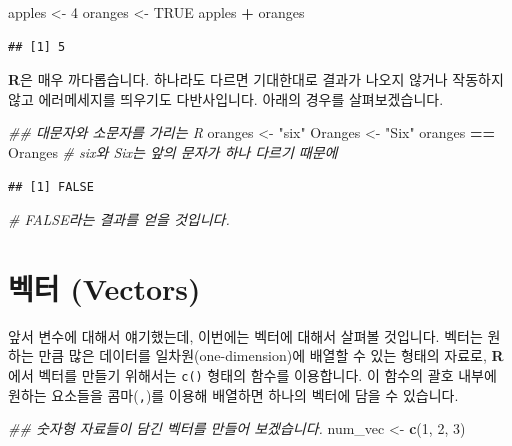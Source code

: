 \documentclass[]{book}
\newenvironment{Shaded}{\begin{snugshade}}{\end{snugshade}}
\newcommand{\CommentTok}[1]{\textcolor[rgb]{0.56,0.35,0.01}{\textit{#1}}}
\newcommand{\DecValTok}[1]{\textcolor[rgb]{0.00,0.00,0.81}{#1}}
\newcommand{\KeywordTok}[1]{\textcolor[rgb]{0.13,0.29,0.53}{\textbf{#1}}}
\newcommand{\NormalTok}[1]{#1}
\newcommand{\OperatorTok}[1]{\textcolor[rgb]{0.81,0.36,0.00}{\textbf{#1}}}
\newcommand{\OtherTok}[1]{\textcolor[rgb]{0.56,0.35,0.01}{#1}}
\newcommand{\StringTok}[1]{\textcolor[rgb]{0.31,0.60,0.02}{#1}}
\begin{document}
\begin{Shaded}
\begin{Highlighting}[]
\NormalTok{apples <-}\StringTok{ }\DecValTok{4} 
\NormalTok{oranges <-}\StringTok{ }\OtherTok{TRUE} 
\NormalTok{apples }\OperatorTok{+}\StringTok{ }\NormalTok{oranges}
\end{Highlighting}
\end{Shaded}

\begin{verbatim}
## [1] 5
\end{verbatim}

\textbf{R}은 매우 까다롭습니다. 하나라도 다르면 기대한대로 결과가 나오지 않거나 작동하지 않고 에러메세지를 띄우기도 다반사입니다. 아래의 경우를 살펴보겠습니다.

\begin{Shaded}
\begin{Highlighting}[]
\CommentTok{## 대문자와 소문자를 가리는 R}
\NormalTok{oranges <-}\StringTok{ "six"} 
\NormalTok{Oranges <-}\StringTok{ "Six"} 
\NormalTok{oranges }\OperatorTok{==}\StringTok{ }\NormalTok{Oranges }\CommentTok{# six와 Six는 앞의 문자가 하나 다르기 때문에 }
\end{Highlighting}
\end{Shaded}

\begin{verbatim}
## [1] FALSE
\end{verbatim}

\begin{Shaded}
\begin{Highlighting}[]
                   \CommentTok{# FALSE라는 결과를 얻을 것입니다.}
\end{Highlighting}
\end{Shaded}

\hypertarget{uxbca1uxd130-vectors}{%
\section{벡터 (Vectors)}\label{uxbca1uxd130-vectors}}

앞서 변수에 대해서 얘기했는데, 이번에는 벡터에 대해서 살펴볼 것입니다. 벡터는 원하는 만큼 많은 데이터를 일차원(one-dimension)에 배열할 수 있는 형태의 자료로, \textbf{R}에서 벡터를 만들기 위해서는 \texttt{c()} 형태의 함수를 이용합니다. 이 함수의 괄호 내부에 원하는 요소들을 콤마(\texttt{,})를 이용해 배열하면 하나의 벡터에 담을 수 있습니다.

\begin{Shaded}
\begin{Highlighting}[]
\CommentTok{## 숫자형 자료들이 담긴 벡터를 만들어 보겠습니다.}
\NormalTok{num_vec <-}\StringTok{ }\KeywordTok{c}\NormalTok{(}\DecValTok{1}\NormalTok{, }\DecValTok{2}\NormalTok{, }\DecValTok{3}\NormalTok{)}
\end{Highlighting}
\end{Shaded}
\end{document}

